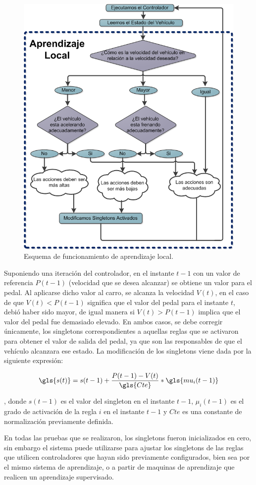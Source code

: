 \begin{figure}[!htb]
\centering
\includegraphics[width=0.75\linewidth, height= 10 cm]{figures/EsquemaLocal.png}
\caption{Esquema de funcionamiento de aprendizaje local.}
\label{fig:esquemaL}
\end{figure}  

Suponiendo una iteración del controlador, en el instante $t-1$ con un valor de referencia $P(t-1)$ (velocidad que se desea alcanzar) se obtiene un valor para el pedal. Al aplicarse dicho valor al carro, se alcanza la velocidad $V(t)$, en el caso de que $V(t) < P(t-1)$ significa que el valor del pedal para el instante $t$, debió haber sido mayor, de igual manera si $V(t) > P(t-1)$ implica que el valor del pedal fue demasiado elevado. En ambos casos, se debe corregir únicamente, los singletons correspondientes a aquellas reglas que se activaron para obtener el valor de salida del pedal, ya que son las responsables de que el vehículo alcanzara ese estado. La modificación de los singletons viene dada por la siguiente expresión:

\begin{equation}\label{eq:single}
\gls{s(t)} = s(t-1) + \frac{P(t-1)-V(t)}{\gls{Cte}}*\gls{mu_{i}(t-1)}
\end{equation}

\noindent, donde $s(t-1)$ es el valor del singleton en el instante $t-1$, $\mu_{i}(t-1)$ es el grado de activación de la regla $i$ en el instante $t-1$ y $Cte$ es una constante de normalización previamente definida. 

En todas las pruebas que se realizaron, los singletons fueron inicializados en cero, sin embargo el sistema puede utilizarse para ajustar los singletons de las reglas que utilicen controladores que hayan sido previamente configurados, bien sea por el mismo sistema de aprendizaje, o a partir de maquinas de aprendizaje que realicen un aprendizaje supervisado.


